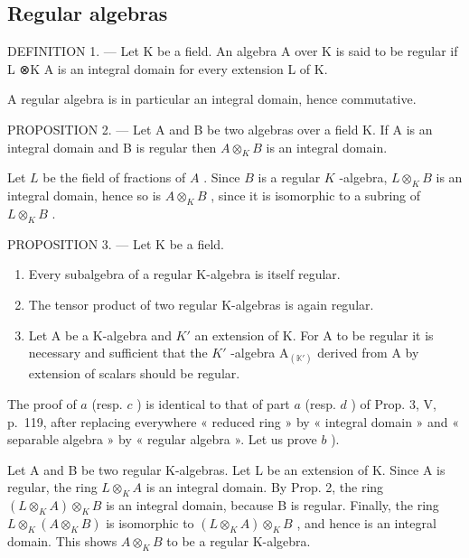 \subsection{Regular algebras}

DEFINITION 1. --- Let K be a field. An algebra A over K is said to be regular if L ⊗K A is an integral domain for every extension L of K.

A regular algebra is in particular an integral domain, hence commutative.

PROPOSITION 2. --- Let A and B be two algebras over a field K. If A is an integral domain and B is regular then \(A \otimes_{K} B\) is an integral domain.

Let \(L\) be the field of fractions of \(A\) . Since \(B\) is a regular \(K\) -algebra, \(L \otimes_K B\) is an integral domain, hence so is \(A \otimes_K B\) , since it is isomorphic to a subring of \(L \otimes_K B\) .

PROPOSITION 3. --- Let K be a field.

\begin{enumerate}
\def\labelenumi{\alph{enumi})}
\item
  Every subalgebra of a regular K-algebra is itself regular.
\item
  The tensor product of two regular K-algebras is again regular.
\item
  Let A be a K-algebra and \(K'\) an extension of K. For A to be regular it is necessary and sufficient that the \(K'\) -algebra \(\mathrm{A}_{(\mathbb{K}')}\) derived from A by extension of scalars should be regular.
\end{enumerate}

The proof of \(a\) (resp. \(c\) ) is identical to that of part \(a\) (resp. \(d\) ) of Prop. 3, V, p.~119, after replacing everywhere « reduced ring » by « integral domain » and « separable algebra » by « regular algebra ». Let us prove \(b\) ).

Let A and B be two regular K-algebras. Let L be an extension of K. Since A is regular, the ring \(L \otimes_{K} A\) is an integral domain. By Prop. 2, the ring \((L \otimes_{K} A) \otimes_{K} B\) is an integral domain, because B is regular. Finally, the ring \(L \otimes_{K} (A \otimes_{K} B)\) is isomorphic to \((L \otimes_{K} A) \otimes_{K} B\) , and hence is an integral domain. This shows \(A \otimes_{K} B\) to be a regular K-algebra.

